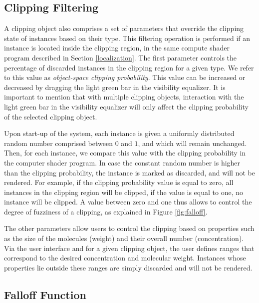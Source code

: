 \subsection{Clipping Filtering} \label{ssec:clip_params}

A clipping object also comprises a set of parameters that override the clipping state of instances based on their type.
This filtering operation is performed if an instance is located inside the clipping region, in the same compute shader program described in Section \ref{localization}.
The first parameter controls the percentage of discarded instances in the clipping region for a given type.
We refer to this value as \emph{object-space clipping probability}.
This value can be increased or decreased by dragging the light green bar in the visibility equalizer.
It is important to mention that with multiple clipping objects, interaction with the light green bar in the visibility equalizer will only affect the clipping probability of the selected clipping object.

Upon start-up of the system, each instance is given a uniformly distributed random number comprised between $0$ and $1$, and which will remain unchanged.
Then, for each instance, we compare this value with the clipping probability in the computer shader program.
In case the constant random number is higher than the clipping probability, the instance is marked as discarded, and will not be rendered. 
For example, if the clipping probability value is equal to zero, all instances in the clipping region will be clipped, if the value is equal to one, no instance will be clipped.
A value between zero and one thus allows to control the degree of fuzziness of a clipping, as explained in Figure \ref{fig:falloff}.

The other parameters allow users to control the clipping based on properties such as the size of the molecules (weight) and their overall number (concentration).
Via the user interface and for a given clipping object, the user defines ranges that correspond to the desired concentration and molecular weight.
Instances whose properties lie outside these ranges are simply discarded and will not be rendered.

\subsection{Falloff Function}

